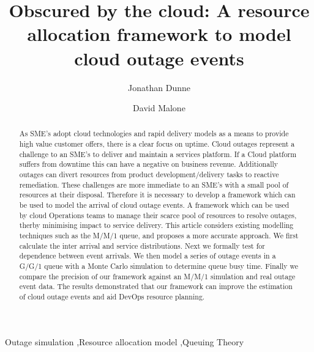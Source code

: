 \documentclass[5p]{elsarticle}
\begin{document}
\begin{frontmatter}

\title{Obscured by the cloud: A resource allocation framework to model cloud outage events}


\author[mymainaddress]{Jonathan Dunne}

\author[mymainaddress]{David Malone}

\address[mymainaddress]{Hamilton Institute, Maynooth University, Kildare, Ireland}

\begin{abstract}
As SME's adopt cloud technologies and rapid delivery models as a means to provide high value customer offers, there is a clear focus on uptime. Cloud outages represent a challenge to an SME's to deliver and maintain a services platform. If a Cloud platform suffers from downtime this can have a negative on business revenue. Additionally outages can divert resources from product development/delivery tasks to reactive remediation. These challenges are more immediate to an SME's with a small pool of resources at their disposal. Therefore it is necessary to develop a framework which can be used to model the arrival of cloud outage events. A framework which can be used by cloud Operations teams to manage their scarce pool of resources to resolve outages, therby minimising impact to service delivery. This article considers existing modelling techniques such as the M/M/1 queue, and proposes a more accurate approach. We first calculate the inter arrival and service distributions. Next we formally test for dependence between event arrivals. We then model a series of outage events in a G/G/1 queue with a Monte Carlo simulation to determine queue busy time.  Finally we compare the precision of our framework against an M/M/1 simulation and real outage event data. The results demonstrated that our framework can improve the estimation of cloud outage events and aid DevOps resource planning.
\end{abstract}

\begin{keyword}
Outage simulation \sep Resource allocation model \sep Queuing Theory 
\end{keyword}

\end{frontmatter}
\end{document}
